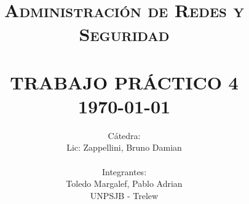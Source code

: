 \title{ \normalsize \textsc{Administración de Redes y Seguridad}
        \\ [2.0cm]
        \HRule{0.5pt} \\
        \LARGE \textbf{\uppercase{Trabajo Práctico 4}}
        \HRule{2pt} \\ [0.5cm]
        \normalsize \today \vspace*{5\baselineskip}}

\date{}

\author{
        Cátedra: \\
        Lic: Zappellini, Bruno Damian \\
\\
        Integrantes: \\
        Toledo Margalef, Pablo Adrian \\
        UNPSJB - Trelew}

\maketitle
